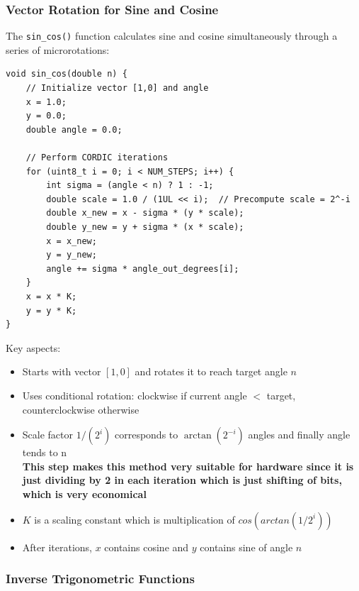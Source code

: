 \documentclass[12pt]{article}
\begin{document}
\subsubsection{Vector Rotation for Sine and Cosine}

The \texttt{sin\_cos()} function calculates sine and cosine simultaneously through a series of microrotations:

\begin{verbatim}
void sin_cos(double n) {
    // Initialize vector [1,0] and angle
    x = 1.0;
    y = 0.0;
    double angle = 0.0;
    
    // Perform CORDIC iterations
    for (uint8_t i = 0; i < NUM_STEPS; i++) {
        int sigma = (angle < n) ? 1 : -1;
        double scale = 1.0 / (1UL << i);  // Precompute scale = 2^-i
        double x_new = x - sigma * (y * scale);
        double y_new = y + sigma * (x * scale);
        x = x_new;
        y = y_new;
        angle += sigma * angle_out_degrees[i];
    }
    x = x * K;
    y = y * K;
}
\end{verbatim}

Key aspects:
\begin{itemize}
    \item Starts with vector $[1,0]$ and rotates it to reach target angle $n$
    \item Uses conditional rotation: clockwise if current angle $<$ target, counterclockwise otherwise
    \item Scale factor $1/(2^i)$ corresponds to $\arctan(2^{-i})$ angles and finally angle tends to n\\
    \textbf{This step makes this method very suitable for hardware since it is just dividing by 2 in each iteration which is just shifting of bits, which is very economical}
    \item $K$ is a scaling constant which is multiplication of $cos(arctan(1/2^i))$
    \item After iterations, $x$ contains cosine and $y$ contains sine of angle $n$
\end{itemize}

\subsubsection{Inverse Trigonometric Functions}
\end{document}
